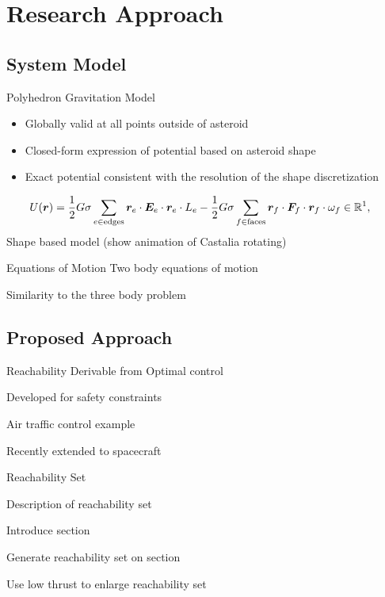 \documentclass[11pt,professionalfonts]{beamer}
\begin{document}
\section*{Research Approach}
\subsection*{System Model}

\begin{frame}{Polyhedron Gravitation Model}

\begin{itemize}
    \item Globally valid at all points outside of asteroid
    \item Closed-form expression of potential based on asteroid shape 
    \item Exact potential consistent with the resolution of the shape discretization
\end{itemize}
{\small
\begin{align*}\label{eq:potential}
    U(\bm{r}) &= \frac{1}{2} G \sigma \sum_{e \in \text{edges}} \bm{r}_e \cdot \bm{E}_e \cdot \bm{r}_e \cdot L_e - \frac{1}{2}G \sigma \sum_{f \in \text{faces}} \bm{r}_f \cdot \bm{F}_f \cdot \bm{r}_f \cdot \omega_f \in \mathbb{R}^1,
\end{align*}
}
Shape based model (show animation of Castalia rotating)
\end{frame}

\begin{frame}{Equations of Motion}
Two body equations of motion

Similarity to the three body problem
\end{frame}


\subsection*{Proposed Approach}

\begin{frame}{Reachability}
Derivable from Optimal control

Developed for safety constraints

Air traffic control example

Recently extended to spacecraft
\end{frame}

\begin{frame}{Reachability Set} %

Description of reachability set

Introduce \Poincare section

Generate reachability set on \Poincare section

Use low thrust to enlarge reachability set
\end{frame} %
\end{document}

